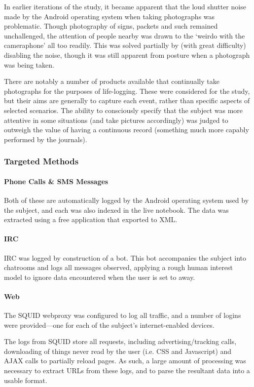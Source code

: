 In earlier iterations of the study, it became apparent that the loud shutter noise made by the Android operating system when taking photographs was problematic.  Though photography of signs, packets and such remained unchallenged, the attention of people nearby was drawn to the `weirdo with the cameraphone' all too readily.  This was solved partially by (with great difficulty) disabling the noise, though it was still apparent from posture when a photograph was being taken.

There are notably a number of products available that continually take photographs for the purposes of life-logging.  These were considered for the study, but their aims are generally to capture each event, rather than specific aspects of selected scenarios.  The ability to consciously specify that the subject was more attentive in some situations (and take pictures accordingly) was judged to outweigh the value of having a continuous record (something much more capably performed by the journals).




\subsubsection{Targeted Methods}
\paragraph{Phone Calls \& SMS Messages}
Both of these are automatically logged by the Android operating system used by the subject, and each was also indexed in the live notebook.  The data was extracted using a free application that exported to XML.


\paragraph{IRC}
IRC was logged by construction of a bot.  This bot accompanies the subject into chatrooms and logs all messages observed, applying a rough human interest model to ignore data encountered when the user is set to away.


\paragraph{Web}
The SQUID webproxy was configured to log all traffic, and a number of logins were provided---one for each of the subject's internet-enabled devices.

The logs from SQUID store all requests, including advertising/tracking calls, downloading of things never read by the user (i.e. CSS and Javascript) and AJAX calls to partially reload pages.  As such, a large amount of processing was necessary to extract URLs from these logs, and to parse the resultant data into a usable format.


